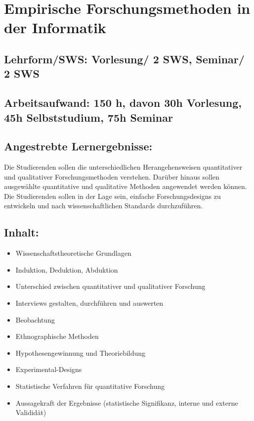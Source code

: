 \chapter{Empirische Forschungsmethoden in der
Informatik}\label{empirische-forschungsmethoden-in-der-informatik}

\section{Lehrform/SWS: Vorlesung/ 2 SWS, Seminar/ 2
SWS}\label{lehrformsws-vorlesung-2-sws-seminar-2-sws}

\section{Arbeitsaufwand: 150 h, davon 30h Vorlesung, 45h
Selbststudium, 75h
Seminar}\label{arbeitsaufwand-150-h-davon-30h-vorlesung-45h-selbststudium-75h-seminar}

\section{Angestrebte
Lernergebnisse:}\label{angestrebte-lernergebnisse-21}

Die Studierenden sollen die unterschiedlichen Herangehensweisen
quantitativer und qualitativer Forschungsmethoden verstehen. Darüber
hinaus sollen ausgewählte quantitative und qualitative Methoden
angewendet werden können. Die Studierenden sollen in der Lage sein,
einfache Forschungsdesigns zu entwickeln und nach wissenschaftlichen
Standards durchzuführen.

\section{Inhalt:}\label{inhalt-21}

\begin{itemize}
\tightlist
\item
  Wissenschaftstheoretische Grundlagen
\item
  Induktion, Deduktion, Abduktion
\item
  Unterschied zwischen quantitativer und qualitativer Forschung
\item
  Interviews gestalten, durchführen und auswerten
\item
  Beobachtung
\item
  Ethnographische Methoden
\item
  Hypothesengewinnung und Theoriebildung
\item
  Experimental-Designs
\item
  Statistische Verfahren für quantitative Forschung
\item
  Aussagekraft der Ergebnisse (statistische Signifikanz, interne und
  externe Valididät)
\end{itemize}

